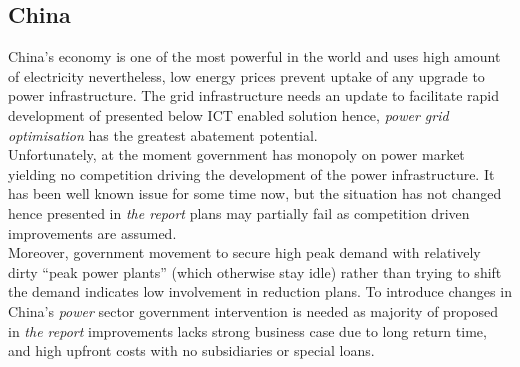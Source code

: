 \documentclass[11pt, twocolumn]{article}
\begin{document}
\subsection{China}
China's economy is one of the most powerful in the world and uses high amount of electricity nevertheless, low energy prices prevent uptake of any upgrade to power infrastructure. The grid infrastructure needs an update to facilitate rapid development of presented below ICT enabled solution hence, \emph{power grid optimisation} has the greatest abatement potential.\\
Unfortunately, at the moment government has monopoly on power market yielding no competition driving the development of the power infrastructure. It has been well known issue for some time now, but the situation has not changed hence presented in \emph{the report} plans may partially fail as competition driven improvements are assumed.\\
Moreover, government movement to secure high peak demand with relatively dirty ``peak power plants'' (which otherwise stay idle) rather than trying to shift the demand indicates low involvement in reduction plans. To introduce changes in China's \emph{power} sector government intervention is needed as majority of proposed in \emph{the report} improvements lacks strong business case due to long return time, and high upfront costs with no subsidiaries or special loans.\\
\end{document}
